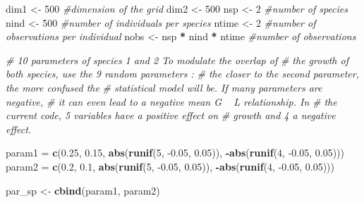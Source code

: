 \documentclass[
]{article}
\newenvironment{Shaded}{\begin{snugshade}}{\end{snugshade}}
\newcommand{\CommentTok}[1]{\textcolor[rgb]{0.56,0.35,0.01}{\textit{#1}}}
\newcommand{\DecValTok}[1]{\textcolor[rgb]{0.00,0.00,0.81}{#1}}
\newcommand{\FloatTok}[1]{\textcolor[rgb]{0.00,0.00,0.81}{#1}}
\newcommand{\KeywordTok}[1]{\textcolor[rgb]{0.13,0.29,0.53}{\textbf{#1}}}
\newcommand{\NormalTok}[1]{#1}
\newcommand{\OperatorTok}[1]{\textcolor[rgb]{0.81,0.36,0.00}{\textbf{#1}}}
\newcommand{\StringTok}[1]{\textcolor[rgb]{0.31,0.60,0.02}{#1}}
\begin{document}
\begin{Shaded}
\begin{Highlighting}[]
\NormalTok{dim1 <-}\StringTok{ }\DecValTok{500}  \CommentTok{#dimension of the grid}
\NormalTok{dim2 <-}\StringTok{ }\DecValTok{500}
\NormalTok{nsp <-}\StringTok{ }\DecValTok{2}  \CommentTok{#number of species}
\NormalTok{nind <-}\StringTok{ }\DecValTok{500}  \CommentTok{#number of individuals per species}
\NormalTok{ntime <-}\StringTok{ }\DecValTok{2}  \CommentTok{#number of observations per individual}
\NormalTok{nobs <-}\StringTok{ }\NormalTok{nsp }\OperatorTok{*}\StringTok{ }\NormalTok{nind }\OperatorTok{*}\StringTok{ }\NormalTok{ntime  }\CommentTok{#number of observations}
\end{Highlighting}
\end{Shaded}

\begin{Shaded}
\begin{Highlighting}[]
\CommentTok{# 10 parameters of species 1 and 2 To modulate the overlap of}
\CommentTok{# the growth of both species, use the 9 random parameters :}
\CommentTok{# the closer to the second parameter, the more confused the}
\CommentTok{# statistical model will be. If many parameters are negative,}
\CommentTok{# it can even lead to a negative mean G ~ L relationship. In}
\CommentTok{# the current code, 5 variables have a positive effect on}
\CommentTok{# growth and 4 a negative effect.}

\NormalTok{param1 =}\StringTok{ }\KeywordTok{c}\NormalTok{(}\FloatTok{0.25}\NormalTok{, }\FloatTok{0.15}\NormalTok{, }\KeywordTok{abs}\NormalTok{(}\KeywordTok{runif}\NormalTok{(}\DecValTok{5}\NormalTok{, }\FloatTok{-0.05}\NormalTok{, }\FloatTok{0.05}\NormalTok{)), }\OperatorTok{-}\KeywordTok{abs}\NormalTok{(}\KeywordTok{runif}\NormalTok{(}\DecValTok{4}\NormalTok{, }
    \FloatTok{-0.05}\NormalTok{, }\FloatTok{0.05}\NormalTok{)))}
\NormalTok{param2 =}\StringTok{ }\KeywordTok{c}\NormalTok{(}\FloatTok{0.2}\NormalTok{, }\FloatTok{0.1}\NormalTok{, }\KeywordTok{abs}\NormalTok{(}\KeywordTok{runif}\NormalTok{(}\DecValTok{5}\NormalTok{, }\FloatTok{-0.05}\NormalTok{, }\FloatTok{0.05}\NormalTok{)), }\OperatorTok{-}\KeywordTok{abs}\NormalTok{(}\KeywordTok{runif}\NormalTok{(}\DecValTok{4}\NormalTok{, }
    \FloatTok{-0.05}\NormalTok{, }\FloatTok{0.05}\NormalTok{)))}

\NormalTok{par_sp <-}\StringTok{ }\KeywordTok{cbind}\NormalTok{(param1, param2)}


\end{Highlighting}
\end{Shaded}
\end{document}

